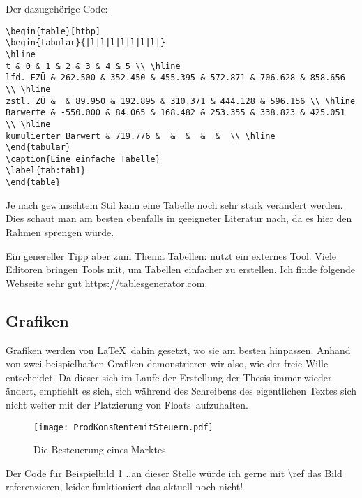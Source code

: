 Der dazugehörige Code:
\begin{lstlisting}[float=htpb,caption=Darstellungen einer Tabelle in \protect\LaTeX{},label=lst:bsptabelle]
\begin{table}[htbp]
\begin{tabular}{|l|l|l|l|l|l|l|}
\hline
t & 0 & 1 & 2 & 3 & 4 & 5 \\ \hline
lfd. EZÜ & 262.500 & 352.450 & 455.395 & 572.871 & 706.628 & 858.656 \\ \hline
zstl. ZÜ &  & 89.950 & 192.895 & 310.371 & 444.128 & 596.156 \\ \hline
Barwerte & -550.000 & 84.065 & 168.482 & 253.355 & 338.823 & 425.051 \\ \hline
kumulierter Barwert & 719.776 &  &  &  &  &  \\ \hline
\end{tabular}
\caption{Eine einfache Tabelle}
\label{tab:tab1}
\end{table}
\end{lstlisting}

Je nach gewünschtem Stil kann eine Tabelle noch sehr stark verändert werden. Dies schaut man am besten ebenfalls in geeigneter Literatur nach, da es hier den Rahmen sprengen würde.

Ein genereller Tipp aber zum Thema Tabellen: nutzt ein externes Tool. Viele Editoren bringen Tools mit, um Tabellen einfacher zu erstellen. Ich finde folgende Webseite sehr gut \href{https://tablesgenerator.com}{https://tablesgenerator.com}.
\subsection{Grafiken}%
\label{sec:graphics}
Grafiken werden von \LaTeX{}\ dahin gesetzt, wo sie am besten hinpassen. Anhand von zwei beispielhaften Grafiken demonstrieren wir also, wie der freie Wille entscheidet. Da dieser sich im Laufe der Erstellung der Thesis immer wieder ändert, empfiehlt es sich, sich während des Schreibens des eigentlichen Textes sich nicht weiter mit der Platzierung von \glqq Floats\grqq\ aufzuhalten.

\begin{figure}[h!]
  \centering
     \texttt{[image: ProdKonsRentemitSteuern.pdf]}
     \caption{Die Besteuerung eines Marktes}
     \label{fig:bild}
\end{figure}

Der Code für Beispielbild 1%
..an dieser Stelle würde ich gerne mit \textbackslash ref das Bild referenzieren, leider funktioniert das aktuell noch nicht!

